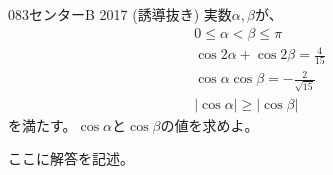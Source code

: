 \begin{prob}{083}{}{センターB 2017 (誘導抜き)}
 実数$\alpha, \beta$が、
 \begin{align*}
  0\le \alpha < \beta \le \pi \\
  \cos 2\alpha + \cos 2\beta = \frac{4}{15} \\
  \cos\alpha \cos\beta = -\frac{2}{\sqrt{15}} \\
  \left|\cos\alpha\right| \ge  \left|\cos\beta\right|
 \end{align*}
 を満たす。$\cos\alpha$と$\cos\beta$の値を求めよ。
\end{prob}

ここに解答を記述。